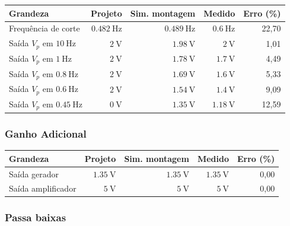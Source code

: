 \documentclass[11pt,a4paper]{article}
\begin{document}
\begin{center}
  \begin{tabular}{@{}lrrrr@{}}
    \toprule
    \textbf{Grandeza} & \textbf{Projeto} & \textbf{Sim. montagem} & \textbf{Medido} & \textbf{Erro (\%)} \\
    \midrule
    Frequência de corte & $\SI{0,482}{\hertz}$ & $\SI{0,489}{\hertz}$ & $\SI{0,6}{\hertz}$ & 22,70 \\

    Saída $V_p$ em $\SI{10}{\hertz}$   & $\SI{2}{\volt}$ & $\SI{1,98}{\volt}$ & $\SI{2}{\volt}$    & 1,01 \\
    Saída $V_p$ em $\SI{1}{\hertz}$    & $\SI{2}{\volt}$ & $\SI{1,78}{\volt}$ & $\SI{1,7}{\volt}$  & 4,49 \\
    Saída $V_p$ em $\SI{0,8}{\hertz}$  & $\SI{2}{\volt}$ & $\SI{1,69}{\volt}$ & $\SI{1,6}{\volt}$  & 5,33 \\
    Saída $V_p$ em $\SI{0,6}{\hertz}$  & $\SI{2}{\volt}$ & $\SI{1,54}{\volt}$ & $\SI{1,4}{\volt}$  & 9,09 \\
    Saída $V_p$ em $\SI{0,45}{\hertz}$ & $\SI{0}{\volt}$ & $\SI{1,35}{\volt}$ & $\SI{1,18}{\volt}$ & 12,59 \\
    \bottomrule
  \end{tabular}
\end{center}

\subsubsection{Ganho Adicional}

\begin{center}
  \begin{tabular}{@{}lrrrr@{}}
    \toprule
    \textbf{Grandeza} & \textbf{Projeto} & \textbf{Sim. montagem} & \textbf{Medido} & \textbf{Erro (\%)} \\
    \midrule
    Saída gerador      & $\SI{1,35}{\volt}$ & $\SI{1,35}{\volt}$ & $\SI{1,35}{\volt}$ & 0,00 \\
    Saída amplificador & $\SI{5}{\volt}$    & $\SI{5}{\volt}$    & $\SI{5}{\volt}$    & 0,00 \\
    \bottomrule
  \end{tabular}
\end{center}

\subsubsection{Passa baixas}
\end{document}
